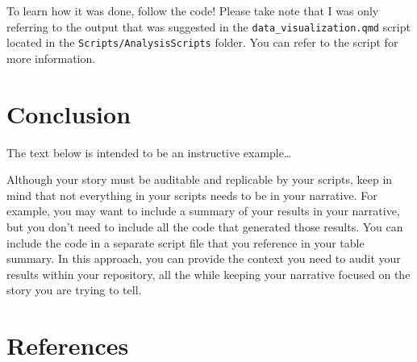 \documentclass[
  a4paper,
]{article}
\begin{document}
To learn how it was done, follow the code! Please take note that I was
only referring to the output that was suggested in the
\texttt{data\_visualization.qmd} script located in the
\texttt{Scripts/AnalysisScripts} folder. You can refer to the script for
more information.


\section{Conclusion}\label{conclusion}

The text below is intended to be an instructive example\ldots{}

Although your story must be auditable and replicable by your scripts,
keep in mind that not everything in your scripts needs to be in your
narrative. For example, you may want to include a summary of your
results in your narrative, but you don't need to include all the code
that generated those results. You can include the code in a separate
script file that you reference in your table summary. In this approach,
you can provide the context you need to audit your results within your
repository, all the while keeping your narrative focused on the story
you are trying to tell.


\section*{References}\label{references}

\end{document}
